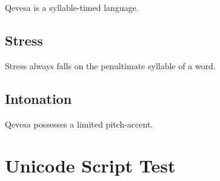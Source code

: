 \documentclass[grammar]{subfiles}
\begin{document}
  Qevesa is a syllable-timed language.
  \ToBeWritten

  \subsection{Stress}
  \label{ssec:stress}

  Stress always falls on the penultimate syllable of a word. 
  \ToBeWritten

  \subsection{Intonation}
  \label{ssec:intonation}

  Qevesa possesses a limited pitch-accent.
  \ToBeWritten

  \section{Unicode Script Test}


\end{document}
